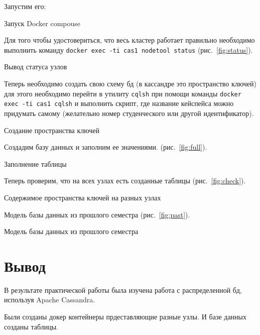 Запустим его:

\begin{image}
	\caption{Запуск Docker compouse}
	\label{fig:docker}
\end{image}

Для того чтобы удостовериться, что весь кластер работает правильно
необходимо выполнить команду \texttt{docker exec -ti cas1 nodetool status}
(рис.~\ref{fig:status}).

\begin{image}
	\caption{Вывод статуса узлов}
	\label{fig:status}
\end{image}

Теперь необходимо создать свою схему бд (в кассандре это
пространство ключей) для этого необходимо перейти в утилиту \texttt{cqlsh}
при помощи команды \texttt{docker exec -ti cas1 cqlsh} и выполнить скрипт,
где название кейспейса можно придумать самому (желательно номер
студенческого или другой идентификатор).

\begin{image}
	\caption{Создание пространства ключей}
	\label{fig:keyspace}
\end{image}

Создадим базу данных и заполним ее значениями.
(рис.~\ref{fig:full}).

\begin{image}
	\caption{Заполнение таблицы}
	\label{fig:full}
\end{image}

Теперь проверим, что на всех узлах есть созданные таблицы
(рис.~\ref{fig:check}).

\begin{image}
	\caption{Содержимое пространства ключей на разных узлах}
	\label{fig:check}
\end{image}

\clearpage

Модель базы данных из прошлого семестра (рис.~\ref{fig:past}).

\begin{image}
	\caption{Модель базы данных из прошлого семестра}
	\label{fig:past}
\end{image}

\section*{\LARGE Вывод}
В результате практической работы была изучена работа
с распределенной бд, используя Apache Cassandra.\par
Были созданы докер контейнеры прдеставляющие разные узлы.
И базе данных созданы таблицы.